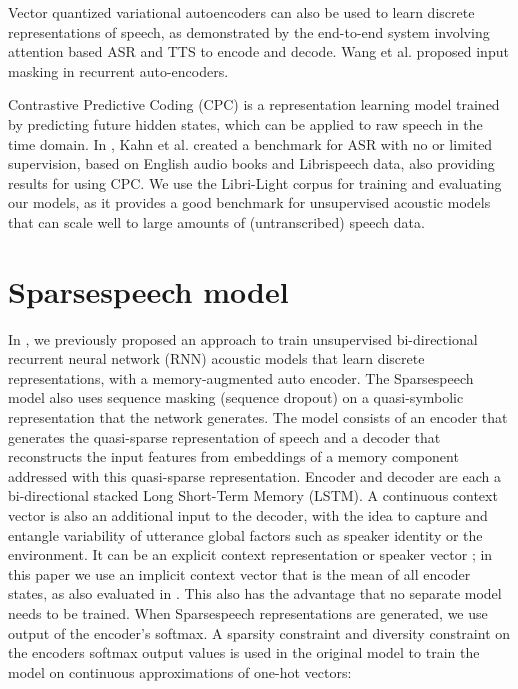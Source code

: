 \documentclass[a4paper]{article}
\begin{document}
Vector quantized variational autoencoders \cite{van2017neural} can also be used to learn discrete representations of speech, as demonstrated by the end-to-end system involving attention based ASR and TTS \cite{tjandra2019vqvae} to encode and decode. Wang et al. proposed input masking \cite{wang2020unsupervised} in recurrent auto-encoders. 

Contrastive Predictive Coding (CPC) \cite{oord2018representation} is a representation learning model trained by predicting future hidden states, which can be applied to raw speech in the time domain.  In \cite{kahn2019libri}, Kahn et al. created a benchmark for ASR with no or limited supervision, based on English audio books and Librispeech data, also providing results for using CPC. We use the Libri-Light corpus for training and evaluating our models, as it provides a good benchmark for unsupervised acoustic models that can scale well to large amounts of (untranscribed) speech data.

\section{Sparsespeech model}



In \cite{milde2019sparsespeech}, we previously proposed an approach to train unsupervised bi-directional recurrent neural network (RNN) acoustic models that learn discrete representations, with a memory-augmented auto encoder. The Sparsespeech model also uses sequence masking (sequence dropout) on a quasi-symbolic representation that the network generates. The model consists of an encoder that generates the quasi-sparse representation of speech and a decoder that reconstructs the input features from embeddings of a memory component addressed with this quasi-sparse representation. Encoder and decoder are each a bi-directional stacked Long Short-Term Memory (LSTM). A continuous context vector is also an additional input to the decoder, with the idea to capture and entangle variability of utterance global factors such as speaker identity or the environment. It can be an explicit context representation \cite{milde2018unspeech} or speaker vector \cite{dehak2011front}; in this paper we use an implicit context vector that is the mean of all encoder states, as also evaluated in \cite{milde2019sparsespeech}. This also has the advantage that no separate model needs to be trained. When Sparsespeech representations are generated, we use output of the encoder's softmax. A sparsity constraint and diversity constraint on the encoders softmax output values  is used in the original model to train the model on continuous approximations of one-hot vectors:
\end{document}
